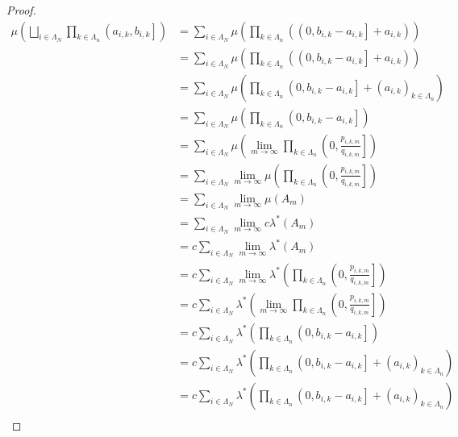\documentclass[dvipdfmx]{jsarticle}
\begin{document}
\begin{proof}
\begin{align*}
\mu\left( \bigsqcup_{i \in \varLambda_{N}} {\prod_{k \in \varLambda_{n}} \left( a_{i,k},b_{i,k} \right]} \right) &= \sum_{i \in \varLambda_{N}} {\mu\left( \prod_{k \in \varLambda_{n}} \left( \left( 0,b_{i,k} - a_{i,k} \right] + a_{i,k} \right) \right)}\\
&= \sum_{i \in \varLambda_{N}} {\mu\left( \prod_{k \in \varLambda_{n}} \left( \left( 0,b_{i,k} - a_{i,k} \right] + a_{i,k} \right) \right)}\\
&= \sum_{i \in \varLambda_{N}} {\mu\left( \prod_{k \in \varLambda_{n}} \left( 0,b_{i,k} - a_{i,k} \right] + \left( a_{i,k} \right)_{k \in \varLambda_{n}} \right)}\\
&= \sum_{i \in \varLambda_{N}} {\mu\left( \prod_{k \in \varLambda_{n}} \left( 0,b_{i,k} - a_{i,k} \right] \right)}\\
&= \sum_{i \in \varLambda_{N}} {\mu\left( \lim_{m \rightarrow \infty}{\prod_{k \in \varLambda_{n}} \left( 0,\frac{p_{i,k,m}}{q_{i,k,m}} \right]} \right)}\\
&= \sum_{i \in \varLambda_{N}} {\lim_{m \rightarrow \infty}{\mu\left( \prod_{k \in \varLambda_{n}} \left( 0,\frac{p_{i,k,m}}{q_{i,k,m}} \right] \right)}}\\
&= \sum_{i \in \varLambda_{N}} {\lim_{m \rightarrow \infty}{\mu\left( A_{m} \right)}}\\
&= \sum_{i \in \varLambda_{N}} {\lim_{m \rightarrow \infty}{c\lambda^{*}\left( A_{m} \right)}}\\
&= c\sum_{i \in \varLambda_{N}} {\lim_{m \rightarrow \infty}{\lambda^{*}\left( A_{m} \right)}}\\
&= c\sum_{i \in \varLambda_{N}} {\lim_{m \rightarrow \infty}{\lambda^{*}\left( \prod_{k \in \varLambda_{n}} \left( 0,\frac{p_{i,k,m}}{q_{i,k,m}} \right] \right)}}\\
&= c\sum_{i \in \varLambda_{N}} {\lambda^{*}\left( \lim_{m \rightarrow \infty}{\prod_{k \in \varLambda_{n}} \left( 0,\frac{p_{i,k,m}}{q_{i,k,m}} \right]} \right)}\\
&= c\sum_{i \in \varLambda_{N}} {\lambda^{*}\left( \prod_{k \in \varLambda_{n}} \left( 0,b_{i,k} - a_{i,k} \right] \right)}\\
&= c\sum_{i \in \varLambda_{N}} {\lambda^{*}\left( \prod_{k \in \varLambda_{n}} \left( 0,b_{i,k} - a_{i,k} \right] + \left( a_{i,k} \right)_{k \in \varLambda_{n}} \right)}\\
&= c\sum_{i \in \varLambda_{N}} {\lambda^{*}\left( \prod_{k \in \varLambda_{n}} \left( 0,b_{i,k} - a_{i,k} \right] + \left( a_{i,k} \right)_{k \in \varLambda_{n}} \right)}\\

\end{align*}
\end{proof}
\end{document}
